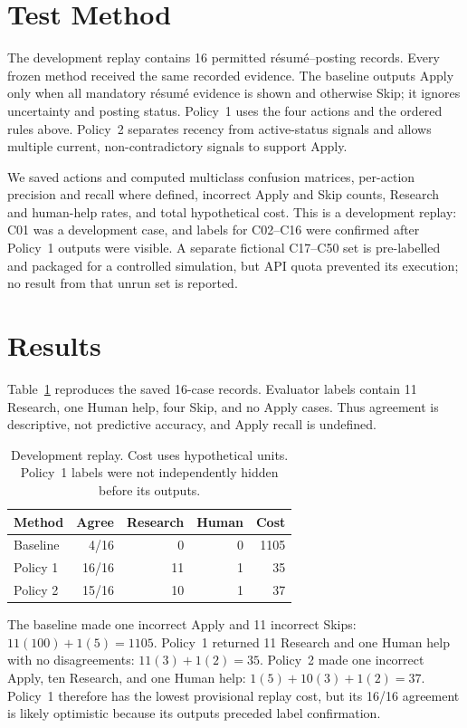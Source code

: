 \documentclass{article}
\begin{document}
\section{Test Method}
The development replay contains 16 permitted r\'esum\'e--posting records. Every frozen method received the same recorded evidence. The baseline outputs Apply only when all mandatory r\'esum\'e evidence is shown and otherwise Skip; it ignores uncertainty and posting status. Policy~1 uses the four actions and the ordered rules above. Policy~2 separates recency from active-status signals and allows multiple current, non-contradictory signals to support Apply.

We saved actions and computed multiclass confusion matrices, per-action precision and recall where defined, incorrect Apply and Skip counts, Research and human-help rates, and total hypothetical cost. This is a development replay: C01 was a development case, and labels for C02--C16 were confirmed after Policy~1 outputs were visible. A separate fictional C17--C50 set is pre-labelled and packaged for a controlled simulation, but API quota prevented its execution; no result from that unrun set is reported.

\section{Results}
Table~\ref{tab:results} reproduces the saved 16-case records. Evaluator labels contain 11 Research, one Human help, four Skip, and no Apply cases. Thus agreement is descriptive, not predictive accuracy, and Apply recall is undefined.

\begin{table}[t]
\centering
\begin{tabular}{lrrrr}
\toprule
Method & Agree & Research & Human & Cost \\
\midrule
Baseline & 4/16 & 0 & 0 & 1105 \\
Policy 1 & 16/16 & 11 & 1 & 35 \\
Policy 2 & 15/16 & 10 & 1 & 37 \\
\bottomrule
\end{tabular}
\caption{Development replay. Cost uses hypothetical units. Policy~1 labels were not independently hidden before its outputs.}
\label{tab:results}
\end{table}

The baseline made one incorrect Apply and 11 incorrect Skips: $11(100)+1(5)=1105$. Policy~1 returned 11 Research and one Human help with no disagreements: $11(3)+1(2)=35$. Policy~2 made one incorrect Apply, ten Research, and one Human help: $1(5)+10(3)+1(2)=37$. Policy~1 therefore has the lowest provisional replay cost, but its 16/16 agreement is likely optimistic because its outputs preceded label confirmation.
\end{document}
